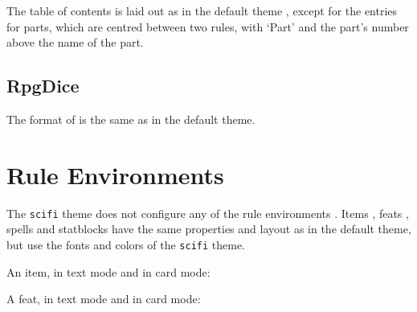 			The table of contents is laid out as in the default theme , except for the entries for parts, which are centred between two rules, with `Part' and the part's number above the name of the part.

		\subsection{RpgDice}

			The format of  is the same as in the default theme.

	\section{Rule Environments}\label{S:ScifiRules}

		The \texttt{scifi} theme does not configure any of the rule environments . Items , feats , spells and statblocks  have the same properties and layout as in the default theme, but use the fonts and colors of the \texttt{scifi} theme.

		An item, in text mode and in card mode:



		A feat, in text mode and in card mode:



